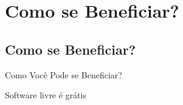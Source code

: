 \documentclass[xcolor=dvipsnames]{beamer}
\begin{document}



\section{Como se Beneficiar?}	
\subsection{Como se Beneficiar?}	

\begin{frame}
\vspace{0.2cm}
\begin{center}
\Huge{Como Você Pode se Beneficiar?}
\end{center}
\end{frame}


\begin{frame}
	\LARGE{Software livre é grátis}
\end{frame}
\end{document}
